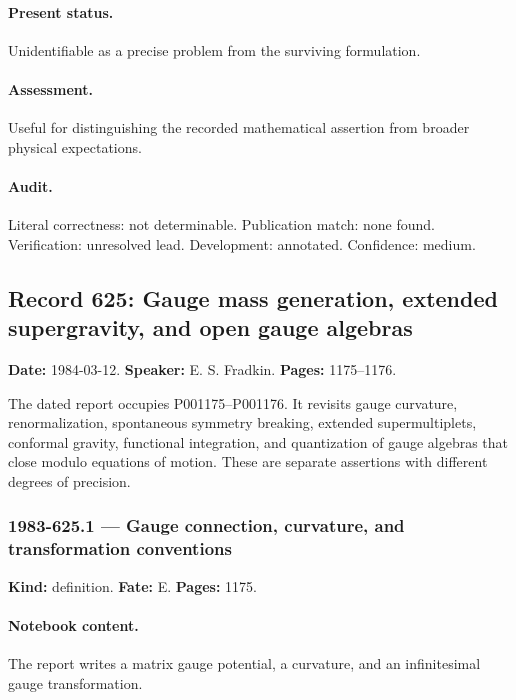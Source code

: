 \paragraph{Present status.} Unidentifiable as a precise problem from the surviving formulation.

\paragraph{Assessment.} Useful for distinguishing the recorded mathematical assertion from broader physical expectations.

\paragraph{Audit.} Literal correctness: not determinable. Publication match: none found. Verification: unresolved lead. Development: annotated. Confidence: medium.

\subsection{Record 625: Gauge mass generation, extended supergravity, and open gauge algebras}

\label{talk:625}

\noindent\textbf{Date:} 1984-03-12. \textbf{Speaker:} E. S. Fradkin. \textbf{Pages:} 1175--1176.\par

The dated report occupies P001175–P001176. It revisits gauge curvature, renormalization, spontaneous symmetry breaking, extended supermultiplets, conformal gravity, functional integration, and quantization of gauge algebras that close modulo equations of motion. These are separate assertions with different degrees of precision.

\subsubsection{1983-625.1 --- Gauge connection, curvature, and transformation conventions}

\label{item:1983-625.1}

\noindent\textbf{Kind:} definition. \textbf{Fate:} E. \textbf{Pages:} 1175.\par

\paragraph{Notebook content.} The report writes a matrix gauge potential, a curvature, and an infinitesimal gauge transformation.

